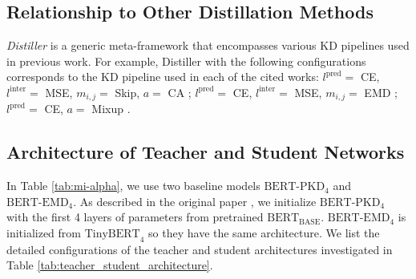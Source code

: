 \documentclass[11pt]{article}
\begin{document}
\subsection{Relationship to Other Distillation Methods}
\emph{Distiller} is a generic meta-framework that encompasses various KD pipelines used in previous work. For example, Distiller with the following configurations corresponds to the KD pipeline used in each of the cited works: 
$l^{\text{pred}} =$ CE, $l^{\text{inter}}=$ MSE, $m_{i,j} = $ Skip, $a = $ CA  \citep{jiao2019tinybert}; 
$l^{\text{pred}} =$ CE, $l^{\text{inter}}=$ MSE, $m_{i,j} = $ EMD \citep{li2020bert}; 
$l^{\text{pred}} =$ CE, $a = $ Mixup  \citep{liang2020mixkd}.
\subsection{Architecture of Teacher and Student Networks}
\label{sec:app:netarch}
In Table \ref{tab:mi-alpha}, we use two baseline models $\text{BERT-PKD}_4$ and $\text{BERT-EMD}_4$. As described in the original paper \citep{sun2019patient}, we initialize $\text{BERT-PKD}_4$ with the first 4 layers of parameters from pretrained $\text{BERT}_\text{BASE}$. $\text{BERT-EMD}_4$ is initialized from $\text{TinyBERT}_4$ so they have the same architecture.
We list the detailed configurations of the teacher and student architectures investigated in Table \ref{tab:teacher_student_architecture}.
\end{document}

